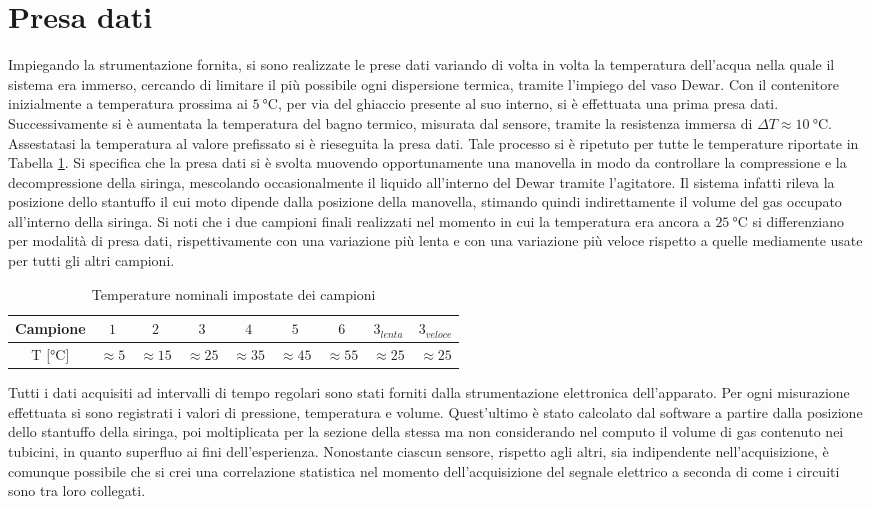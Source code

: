 \documentclass[a4paper,11pt,oneside]{article}
\begin{document}
\section{Presa dati}
Impiegando la strumentazione fornita, si sono realizzate le prese dati variando di volta in volta la temperatura dell'acqua nella quale il sistema era immerso, cercando di limitare il più possibile ogni dispersione termica, tramite l'impiego del vaso Dewar. Con il contenitore inizialmente a temperatura prossima ai $\SI{5}{\celsius}$, per via del ghiaccio presente al suo interno, si è effettuata una prima presa dati. Successivamente si è aumentata la temperatura del bagno termico, misurata dal sensore, tramite la resistenza immersa di $\Delta T \approx\SI{10}{\celsius}$. Assestatasi la temperatura al valore prefissato si è rieseguita la presa dati. Tale processo si è ripetuto per tutte le temperature riportate in Tabella \ref{tab:camp_temp}. Si specifica che la presa dati si è svolta muovendo opportunamente una manovella in modo da controllare la compressione e la decompressione della siringa, mescolando occasionalmente il liquido all'interno del Dewar tramite l'agitatore. Il sistema infatti rileva la posizione dello stantuffo il cui moto dipende dalla posizione della manovella, stimando quindi indirettamente il volume del gas occupato all'interno della siringa. Si noti che i due campioni finali realizzati nel momento in cui la temperatura era ancora a $\SI{25}{\celsius}$ si differenziano per modalità di presa dati, rispettivamente con una variazione più lenta e con una variazione più veloce rispetto a quelle mediamente usate per tutti gli altri campioni.

\begin{table}[h!]
    \centering
    \begin{tabular}{|c|c|c|c|c|c|c|c|c|}
        \hline
        Campione & $1$ & $2$ & $3$ & $4$ & $5$ & $6$ & $3_{lenta}$ & $3_{veloce}$\\\hline
        \rowcolor[rgb]{0.85,0.85,0.85} T [$\si{\celsius}$] & $\approx5$ & $\approx15$ & $\approx25$ & $\approx35$ & $\approx45$ & $\approx55$ & $\approx25$ & $\approx25$ \\\hline
    \end{tabular}
    \caption{Temperature nominali impostate  dei campioni}
    \label{tab:camp_temp}
\end{table}

Tutti i dati acquisiti ad intervalli di tempo regolari sono stati forniti dalla strumentazione elettronica dell'apparato. Per ogni misurazione effettuata si sono registrati i valori di pressione, temperatura e volume. Quest'ultimo è stato calcolato dal software a partire dalla posizione dello stantuffo della siringa, poi moltiplicata per la sezione della stessa ma non considerando nel computo il volume di gas contenuto nei tubicini, in quanto superfluo ai fini dell'esperienza. Nonostante ciascun sensore, rispetto agli altri, sia indipendente nell'acquisizione, è comunque possibile che si crei una correlazione statistica nel momento dell'acquisizione del segnale elettrico a seconda di come i circuiti sono tra loro collegati.
\end{document}
